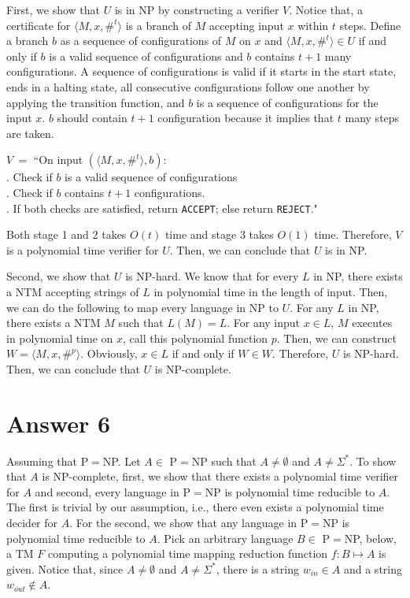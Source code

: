\documentclass[12pt]{article}
\begin{document}
First, we show that $U$ is in NP by constructing a verifier $V$. Notice that, a certificate for $\langle M, x, \#^t \rangle$ is a branch of $M$ accepting input $x$ within $t$ steps. Define a branch $b$ as a sequence of configurations of $M$ on $x$ and $\langle M, x, \#^t \rangle \in U$ if and only if $b$ is a valid sequence of configurations and $b$ contains $t + 1$ many configurations. A sequence of configurations is valid if it starts in the start state, ends in a halting state, all consecutive configurations follow one another by applying the transition function, and $b$ is a sequence of configurations for the input $x$. $b$ should contain $t + 1$ configuration because it implies that $t$ many steps are taken.


$V \ =$ ``On input $(\langle M, x, \#^t \rangle, b)$:\\
	\indent{}. Check if $b$ is a valid sequence of configurations\\
	\indent{}. Check if $b$ contains $t + 1$ configurations.\\
	\indent{}. If both checks are satisfied, return \texttt{ACCEPT}; else return \texttt{REJECT}."
	
Both stage 1 and 2 takes $O(t)$ time and stage 3 takes $O(1)$ time. Therefore, $V$ is a polynomial time verifier for $U$. Then, we can conclude that $U$ is in NP.

Second, we show that $U$ is NP-hard. We know that for every $L$ in NP, there exists a NTM accepting strings of $L$ in polynomial time in the length of input. Then, we can do the following to map every language in NP to $U$. For any $L$ in NP, there exists a NTM $M$ such that $L(M) = L$. For any input $x \in L$, $M$ executes in polynomial time on $x$, call this polynomial function $p$. Then, we can construct $W = \langle M, x, \#^p \rangle$. Obviously, $x \in L$ if and only if $W \in W$. Therefore, $U$ is NP-hard. Then, we can conclude that $U$ is NP-complete.

\section*{Answer 6}

Assuming that P$=$NP. Let $A \in $ P$=$NP such that $A \neq \emptyset$ and $A \neq \Sigma^*$. To show that $A$ is NP-complete, first, we show that there exists a polynomial time verifier for $A$ and second, every language in P$=$NP is polynomial time reducible to $A$. The first is trivial by our assumption, i.e., there even exists a polynomial time decider for $A$. For the second, we show that any language in P$=$NP is polynomial time reducible to $A$. Pick an arbitrary language $B \in$ P$=$NP, below, a TM $F$ computing a polynomial time mapping reduction function $f: B \mapsto A$ is given. Notice that, since $A \neq \emptyset$ and $A \neq \Sigma^*$, there is a string $w_{in} \in A$ and a string $w_{out} \not \in A$.
\end{document}
